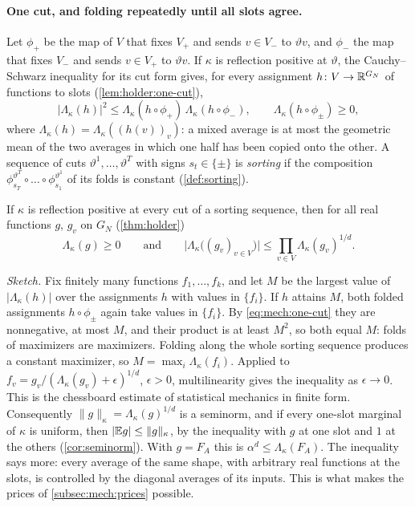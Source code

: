 \paragraph{One cut, and folding repeatedly until all slots agree.}
Let $\phi_+$ be the map of $V$ that fixes $V_+$ and sends $v\in V_-$ to
$\vartheta v$, and $\phi_-$ the map that fixes $V_-$ and sends $v\in V_+$ to
$\vartheta v$. If $\kappa$ is reflection positive at $\vartheta$, the
Cauchy--Schwarz inequality for its cut form gives, for every assignment
$h\colon V\to\mathbb R^{G_N}$ of functions to slots (\cref{lem:holder:one-cut}),
\begin{equation}\label{eq:mech:one-cut}
 \bigl|\Lambda_\kappa(h)\bigr|^2\le\Lambda_\kappa(h\circ\phi_+)\,
 \Lambda_\kappa(h\circ\phi_-),\qquad\Lambda_\kappa(h\circ\phi_\pm)\ge0,
\end{equation}
where $\Lambda_\kappa(h)=\Lambda_\kappa((h(v))_v)$: a mixed average is at most the
geometric mean of the two averages in which one half has been copied onto
the other. A sequence of cuts $\vartheta^1,\dots,\vartheta^T$ with signs
$s_t\in\{\pm\}$ is \emph{sorting} if the composition
$\phi^{\vartheta^T}_{s_T}\circ\dots\circ\phi^{\vartheta^1}_{s_1}$ of its folds is
constant (\cref{def:sorting}).

\begin{theorem*}
If $\kappa$ is reflection positive at every cut of a sorting sequence, then
for all real functions $g$, $g_v$ on $G_N$ \textup{(\cref{thm:holder})}
\[
 \Lambda_\kappa(g)\ge0\qquad\text{and}\qquad
 \bigl|\Lambda_\kappa\bigl((g_v)_{v\in V}\bigr)\bigr|
 \le\prod_{v\in V}\Lambda_\kappa(g_v)^{1/d}.
\]
\end{theorem*}

\emph{Sketch.} Fix finitely many functions $f_1,\dots,f_k$, and let $M$ be the
largest value of $|\Lambda_\kappa(h)|$ over the assignments $h$ with values in
$\{f_i\}$. If $h$ attains $M$, both folded assignments $h\circ\phi_\pm$ again
take values in $\{f_i\}$. By \eqref{eq:mech:one-cut} they are nonnegative,
at most $M$, and their product is at least $M^2$, so both equal $M$: folds of
maximizers are maximizers. Folding along the whole sorting sequence
produces a constant maximizer, so $M=\max_i\Lambda_\kappa(f_i)$. Applied to
$f_v=g_v/(\Lambda_\kappa(g_v)+\epsilon)^{1/d}$, $\epsilon>0$, multilinearity gives
the inequality as $\epsilon\to0$. This is the chessboard estimate of statistical mechanics in
finite form. Consequently $\|g\|_\kappa=\Lambda_\kappa(g)^{1/d}$ is a seminorm, and
if every one-slot marginal of $\kappa$ is uniform, then $|\mathbb E g|\le\|g\|_\kappa$,
by the inequality with $g$ at one slot and $1$ at the others
(\cref{cor:seminorm}). With $g=F_A$ this is $\alpha^d\le\Lambda_\kappa(F_A)$. The
inequality says more: every average of the same shape, with arbitrary real
functions at the slots, is controlled by the diagonal averages of its
inputs. This is what makes the prices of \cref{subsec:mech:prices} possible.

